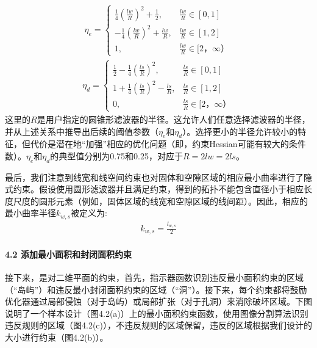 \documentclass[a4paper,10pt,english]{sphinxmanual}
\begin{document}
\begin{equation*}
\begin{split}\eta_e = \begin {cases} \frac{1}{4}(\frac{lw}{R})^2+\frac{1}{2}, & \frac{lw}{R}∈[0,1]  \\  -\frac{1}{4}(\frac{lw}{R})^2+\frac{lw}{R}, & \frac{lw}{R}∈[1,2]   \\ 1,   & \frac{lw}{R}∈[2，∞）    \end {cases}\end{split}
\end{equation*}\begin{equation*}
\begin{split}\eta_d = \begin {cases} \frac{1}{2}- \frac{1}{4}(\frac{ls}{R})^2, & \frac{ls}{R}∈[0,1]  \\  1+\frac{1}{4}(\frac{ls}{R})^2-\frac{ls}{R}, & \frac{ls}{R}∈[1,2]   \\ 0,   & \frac{ls}{R}∈[2，∞）    \end {cases}\end{split}
\end{equation*}
\sphinxAtStartPar
这里的\(R\)是用户指定的圆锥形滤波器的半径。这允许人们任意选择滤波器的半径，并从上述关系中推导出后续的阈值参数（\(η_{e}\)和\(η_{d}\)）。选择更小的半径允许较小的特征，但代价是潜在地“加强”相应的优化问题（即，约束Hessian可能有较大的条件数）。\(η_{e}\)和\(η_{d}\)的典型值分别为0.75和0.25，对应于\(R = 2lw = 2ls\)。

\sphinxAtStartPar
最后，我们注意到线宽和线空间约束也对固体和空隙区域的相应最小曲率进行了隐式约束。假设使用圆形滤波器并且满足约束，得到的拓扑不能包含直径小于相应长度尺度的圆形元素（例如，固体区域的线宽和空隙区域的线间距）。因此，相应的最小曲率半径\(k_{w,s}\)被定义为:
\begin{equation*}
\begin{split}k_{w,s} = \frac{l_{w,s} }{2}\end{split}
\end{equation*}

\paragraph{4.2 添加最小面积和封闭面积约束}
\label{\detokenize{_u7b80_u4ecb/_u6838_u5fc3_u8bbe_u8ba1_u4f18_u5316_u7b97_u6cd5/_u68af_u5ea6_u62d3_u6251_u4f18_u5316_u6a21_u5757/_u68af_u5ea6_u62d3_u6251_u4f18_u5316_u7b97_u6cd5:id16}}
\sphinxAtStartPar
接下来，是对二维平面的约束，首先，指示器函数识别违反最小面积约束的区域（“岛屿”）和违反最小封闭面积约束的区域（“洞”）。接下来，每个约束都将鼓励优化器通过局部侵蚀（对于岛屿）或局部扩张（对于孔洞）来消除破坏区域。下图说明了一个样本设计（图4.2(a)）上的最小面积约束函数，使用图像分割算法识别违反规则的区域（图4.2(c)），不违反规则的区域保留，违反的区域根据我们设计的大小进行约束（图4.2(b)）。
\end{document}
